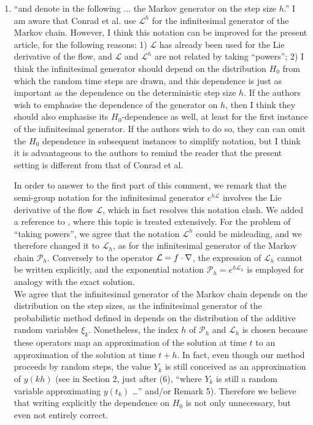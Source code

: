 \documentclass[10pt]{article}
\begin{document}
\begin{enumerate}
	\item 
	\begin{itquote} 
		``and denote in the following ... the Markov generator on the step size $h$.'' I am aware that Conrad et al. use $\mathcal{L}^h$ for the infinitesimal generator of the Markov chain. However, I think this notation can be improved for the present article, for the following reasons: 1) $\mathcal{L}$ has already been used for the Lie derivative of the flow, and $\mathcal{L}$ and $\mathcal{L}^h$ are not related by taking ``powers''; 2) I think the infinitesimal generator should depend on the distribution $H_0$ from which the random time steps are drawn, and this dependence is just as important as the dependence on the deterministic step size $h$. If the authors wish to emphasise the dependence of the generator on $h$, then I think they should also emphasise its $H_0$-dependence as well, at least for the first instance of the infinitesimal generator. If the authors wish to do so, they can can omit the $H_0$ dependence in subsequent instances to simplify notation, but I think it is advantageous to the authors to remind the reader that the present setting is different from that of Conrad et al.
	\end{itquote}
	In order to answer to the first part of this comment, we remark that the semi-group notation for the infinitesimal generator $e^{h\mathcal L}$ involves the Lie derivative of the flow $\mathcal L$, which in fact resolves this notation clash. We added a reference to \cite[Section 4.3]{PaS08}, where this topic is treated extensively. For the problem of ``taking powers'', we agree that the notation $\mathcal L^h$ could be misleading, and we therefore changed it to $\mathcal L_h$, as for the infinitesimal generator of the Markov chain $\mathcal P_h$. Conversely to the operator $\mathcal{L} = f \cdot \nabla$, the expression of $\mathcal L_h$ cannot be written explicitly, and the exponential notation $\mathcal P_h = e^{h\mathcal L_h}$ is employed for analogy with the exact solution. \\
	We agree that the infinitesimal generator of the Markov chain depends on the distribution on the step sizes, as the infinitesimal generator of the probabilistic method defined in \cite{CGS17} depends on the distribution of the additive random variables $\xi_k$. Nonetheless, the index $h$ of $\mathcal P_h$ and $\mathcal L_h$ is chosen because these operators map an approximation of the solution at time $t$ to an approximation of the solution at time $t+h$. In fact, even though our method proceeds by random steps, the value $Y_k$ is still conceived as an approximation of $y(kh)$ (see in Section 2, just after (6), ``where $Y_k$ is still a random variable approximating $y(t_k)$ \ldots'' and/or Remark 5). Therefore we believe that writing explicitly the dependence on $H_0$ is not only unnecessary, but even not entirely correct.

\end{enumerate}
\end{document}
